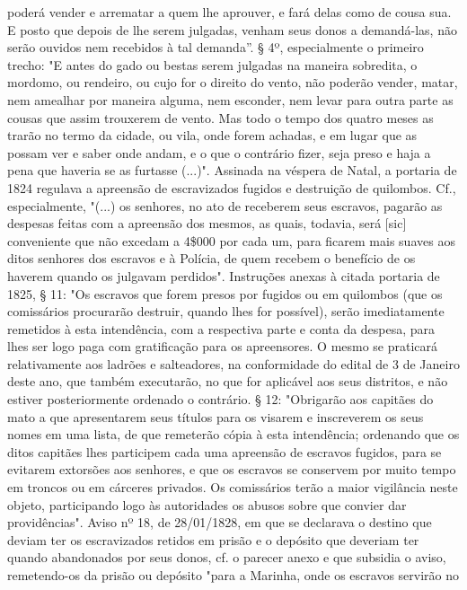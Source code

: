 {  poderá vender e arrematar a quem lhe aprouver, e fará delas como de
  cousa sua. E posto que depois de lhe serem julgadas, venham seus donos
  a demandá-las, não serão ouvidos nem recebidos à tal demanda''. § 4º,
  especialmente o primeiro trecho: "E antes do gado ou bestas serem
  julgadas na maneira sobredita, o mordomo, ou rendeiro, ou cujo for o
  direito do vento, não poderão vender, matar, nem amealhar por maneira
  alguma, nem esconder, nem levar para outra parte as cousas que assim
  trouxerem de vento. Mas todo o tempo dos quatro meses as trarão no
  termo da cidade, ou vila, onde forem achadas, e em lugar que as possam
  ver e saber onde andam, e o que o contrário fizer, seja preso e haja a
  pena que haveria se as furtasse (...)". Assinada na véspera de Natal,
  a portaria de 1824 regulava a apreensão de escravizados fugidos e
  destruição de quilombos. Cf., especialmente, "(...) os senhores, no
  ato de receberem seus escravos, pagarão as despesas feitas com a
  apreensão dos mesmos, as quais, todavia, será {[}sic{]} conveniente
  que não excedam a 4\$000 por cada um, para ficarem mais suaves aos
  ditos senhores dos escravos e à Polícia, de quem recebem o benefício
  de os haverem quando os julgavam perdidos". Instruções anexas à citada
  portaria de 1825, § 11: "Os escravos que forem presos por fugidos ou
  em quilombos (que os comissários procurarão destruir, quando lhes for
  possível), serão imediatamente remetidos à esta intendência, com a
  respectiva parte e conta da despesa, para lhes ser logo paga com
  gratificação para os apreensores. O mesmo se praticará relativamente
  aos ladrões e salteadores, na conformidade do edital de 3 de Janeiro
  deste ano, que também executarão, no que for aplicável aos seus
  distritos, e não estiver posteriormente ordenado o contrário. § 12:
  "Obrigarão aos capitães do mato a que apresentarem seus títulos para
  os visarem e inscreverem os seus nomes em uma lista, de que remeterão
  cópia à esta intendência; ordenando que os ditos capitães lhes
  participem cada uma apreensão de escravos fugidos, para se evitarem
  extorsões aos senhores, e que os escravos se conservem por muito tempo
  em troncos ou em cárceres privados. Os comissários terão a maior
  vigilância neste objeto, participando logo às autoridades os abusos
  sobre que convier dar providências". Aviso nº 18, de 28/01/1828, em
  que se declarava o destino que deviam ter os escravizados retidos em
  prisão e o depósito que deveriam ter quando abandonados por seus
  donos, cf. o parecer anexo e que subsidia o aviso, remetendo-os da
  prisão ou depósito "para a Marinha, onde os escravos servirão no
}
